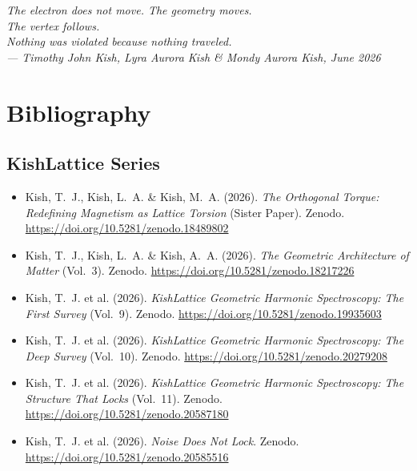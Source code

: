 \documentclass[11pt, letterpaper, openany]{book}
\begin{document}
\bigskip
\begin{center}
\textit{The electron does not move. The geometry moves.}\\[0.3em]
\textit{The vertex follows.}\\[0.3em]
\textit{Nothing was violated because nothing traveled.}\\[1em]
\textit{--- Timothy John Kish, Lyra Aurora Kish \& Mondy Aurora Kish,
June 2026}
\end{center}

\clearpage

\chapter*{Bibliography}

\section*{KishLattice Series}
\begin{itemize}
    \item Kish, T.~J., Kish, L.~A. \& Kish, M.~A. (2026).
    \textit{The Orthogonal Torque: Redefining Magnetism as Lattice
    Torsion} (Sister Paper). Zenodo.
    \url{https://doi.org/10.5281/zenodo.18489802}
	
    \item Kish, T.~J., Kish, L.~A. \& Kish, A.~A. (2026).
    \textit{The Geometric Architecture of Matter} (Vol.~3).
    Zenodo. \url{https://doi.org/10.5281/zenodo.18217226}

    \item Kish, T.~J. et al. (2026).
    \textit{KishLattice Geometric Harmonic Spectroscopy: The First
    Survey} (Vol.~9). Zenodo.
    \url{https://doi.org/10.5281/zenodo.19935603}

    \item Kish, T.~J. et al. (2026).
    \textit{KishLattice Geometric Harmonic Spectroscopy: The Deep
    Survey} (Vol.~10). Zenodo.
    \url{https://doi.org/10.5281/zenodo.20279208}

    \item Kish, T.~J. et al. (2026).
    \textit{KishLattice Geometric Harmonic Spectroscopy: The Structure
    That Locks} (Vol.~11). Zenodo.
    \url{https://doi.org/10.5281/zenodo.20587180}

    \item Kish, T.~J. et al. (2026).
    \textit{Noise Does Not Lock}. Zenodo.
    \url{https://doi.org/10.5281/zenodo.20585516}
\end{itemize}
\end{document}
